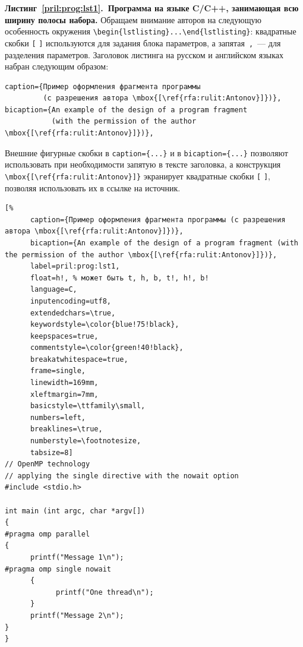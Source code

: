 \documentclass[10pt,a4paper]{book}
\begin{document}
\newpage
{}


\textbf{Листинг~\ref{pril:prog:lst1}.~Программа на языке C/C++, занимающая всю ширину 
полосы набора.} Обращаем внимание авторов на следующую особенность окружения
\verb!\begin{lstlisting}...\end{lstlisting}!:
квадратные скобки \verb![! \verb!]! используются для задания блока параметров,
а запятая~\verb!,!~--- для разделения параметров. Заголовок листинга на русском и 
английском языках набран следующим образом:
\begin{verbatim}
caption={Пример оформления фрагмента программы 
         (с разрешения автора \mbox{[\ref{rfa:rulit:Antonov}]})},
bicaption={An example of the design of a program fragment 
           (with the permission of the author \mbox{[\ref{rfa:rulit:Antonov}]})},
\end{verbatim}
Внешние фигурные скобки в \verb!caption={...}! и в \verb!bicaption={...}!
позволяют использовать при необходимости запятую в тексте заголовка,
а конструкция \verb!\mbox{[\ref{rfa:rulit:Antonov}]}! экранирует
квадратные скобки \verb![! \verb!]!, позволяя использовать их в ссылке 
на источник.
%
%
\begin{lstlisting}[%
      caption={Пример оформления фрагмента программы (с разрешения автора \mbox{[\ref{rfa:rulit:Antonov}]})},
      bicaption={An example of the design of a program fragment (with the permission of the author \mbox{[\ref{rfa:rulit:Antonov}]})},
      label=pril:prog:lst1,
      float=h!, % может быть t, h, b, t!, h!, b!
      language=C, 
      inputencoding=utf8, 
      extendedchars=\true, 
      keywordstyle=\color{blue!75!black}, 
      keepspaces=true, 
      commentstyle=\color{green!40!black}, 
      breakatwhitespace=true,
      frame=single, 
      linewidth=169mm,
      xleftmargin=7mm,
      basicstyle=\ttfamily\small,
      numbers=left,
      breaklines=\true, 
      numberstyle=\footnotesize,
      tabsize=8]
// OpenMP technology
// applying the single directive with the nowait option 
#include <stdio.h>

int main (int argc, char *argv[])
{
#pragma omp parallel
{
      printf("Message 1\n");
#pragma omp single nowait
      {
            printf("One thread\n");
      }
      printf("Message 2\n");
}
}
\end{lstlisting}
\end{document}
